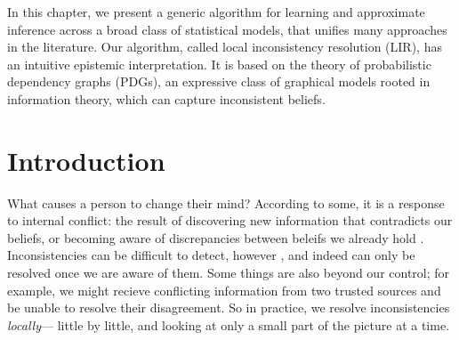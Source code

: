 In this chapter, 
we present a generic algorithm
    for learning and
    approximate inference
    across a broad class of statistical models,
    that unifies many approaches in the literature.
Our algorithm,
    called local inconsistency resolution (LIR),
    has an intuitive epistemic interpretation.
It is based on the theory of
    probabilistic dependency graphs (PDGs),
    an expressive class of graphical models
        rooted in information theory,
        which can capture inconsistent beliefs.

\section{Introduction}
What causes a person to change their mind?
According to some,
    it is a response to internal conflict:
    the result of
    discovering new information that contradicts our beliefs, or
    becoming aware of discrepancies between beleifs we already hold
    \cite{festinger1962cognitive}.
Inconsistencies
    can be difficult to detect, however
    \cite{selman1996generating}, and indeed can only
    be resolved once we are aware of them.
Some things are also
 beyond our control;
    for example, we might recieve conflicting information
        from two trusted sources and be unable to resolve
        their disagreement.
So in practice, we resolve inconsistencies \emph{locally}---%
    little by little, and looking at
        only a small part of the picture at a time.

